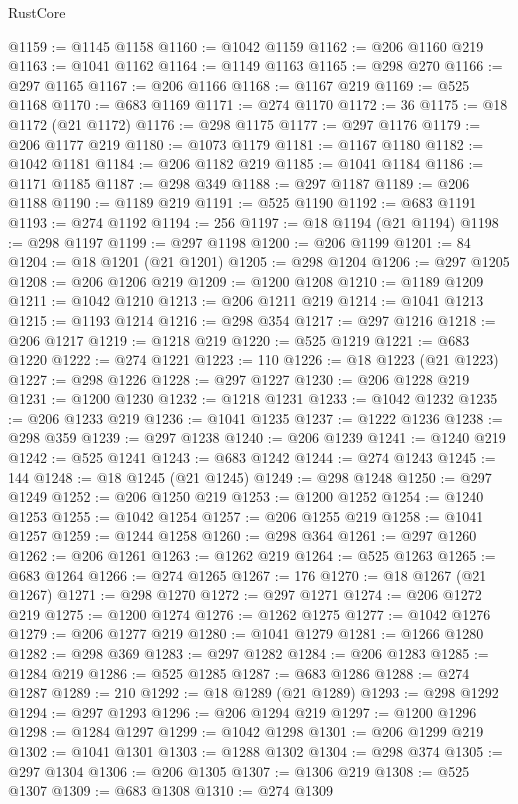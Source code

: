 \begin{lexlean}{RustCore}
\begin{coremodule}
@1159 := @1145 @1158
@1160 := @1042 @1159
@1162 := @206 @1160 @219
@1163 := @1041 @1162
@1164 := @1149 @1163
@1165 := @298 @270
@1166 := @297 @1165
@1167 := @206 @1166
@1168 := @1167 @219
@1169 := @525 @1168
@1170 := @683 @1169
@1171 := @274 @1170
@1172 := 36
@1175 := @18 @1172 (@21 @1172)
@1176 := @298 @1175
@1177 := @297 @1176
@1179 := @206 @1177 @219
@1180 := @1073 @1179
@1181 := @1167 @1180
@1182 := @1042 @1181
@1184 := @206 @1182 @219
@1185 := @1041 @1184
@1186 := @1171 @1185
@1187 := @298 @349
@1188 := @297 @1187
@1189 := @206 @1188
@1190 := @1189 @219
@1191 := @525 @1190
@1192 := @683 @1191
@1193 := @274 @1192
@1194 := 256
@1197 := @18 @1194 (@21 @1194)
@1198 := @298 @1197
@1199 := @297 @1198
@1200 := @206 @1199
@1201 := 84
@1204 := @18 @1201 (@21 @1201)
@1205 := @298 @1204
@1206 := @297 @1205
@1208 := @206 @1206 @219
@1209 := @1200 @1208
@1210 := @1189 @1209
@1211 := @1042 @1210
@1213 := @206 @1211 @219
@1214 := @1041 @1213
@1215 := @1193 @1214
@1216 := @298 @354
@1217 := @297 @1216
@1218 := @206 @1217
@1219 := @1218 @219
@1220 := @525 @1219
@1221 := @683 @1220
@1222 := @274 @1221
@1223 := 110
@1226 := @18 @1223 (@21 @1223)
@1227 := @298 @1226
@1228 := @297 @1227
@1230 := @206 @1228 @219
@1231 := @1200 @1230
@1232 := @1218 @1231
@1233 := @1042 @1232
@1235 := @206 @1233 @219
@1236 := @1041 @1235
@1237 := @1222 @1236
@1238 := @298 @359
@1239 := @297 @1238
@1240 := @206 @1239
@1241 := @1240 @219
@1242 := @525 @1241
@1243 := @683 @1242
@1244 := @274 @1243
@1245 := 144
@1248 := @18 @1245 (@21 @1245)
@1249 := @298 @1248
@1250 := @297 @1249
@1252 := @206 @1250 @219
@1253 := @1200 @1252
@1254 := @1240 @1253
@1255 := @1042 @1254
@1257 := @206 @1255 @219
@1258 := @1041 @1257
@1259 := @1244 @1258
@1260 := @298 @364
@1261 := @297 @1260
@1262 := @206 @1261
@1263 := @1262 @219
@1264 := @525 @1263
@1265 := @683 @1264
@1266 := @274 @1265
@1267 := 176
@1270 := @18 @1267 (@21 @1267)
@1271 := @298 @1270
@1272 := @297 @1271
@1274 := @206 @1272 @219
@1275 := @1200 @1274
@1276 := @1262 @1275
@1277 := @1042 @1276
@1279 := @206 @1277 @219
@1280 := @1041 @1279
@1281 := @1266 @1280
@1282 := @298 @369
@1283 := @297 @1282
@1284 := @206 @1283
@1285 := @1284 @219
@1286 := @525 @1285
@1287 := @683 @1286
@1288 := @274 @1287
@1289 := 210
@1292 := @18 @1289 (@21 @1289)
@1293 := @298 @1292
@1294 := @297 @1293
@1296 := @206 @1294 @219
@1297 := @1200 @1296
@1298 := @1284 @1297
@1299 := @1042 @1298
@1301 := @206 @1299 @219
@1302 := @1041 @1301
@1303 := @1288 @1302
@1304 := @298 @374
@1305 := @297 @1304
@1306 := @206 @1305
@1307 := @1306 @219
@1308 := @525 @1307
@1309 := @683 @1308
@1310 := @274 @1309

\end{coremodule}
\end{lexlean}
